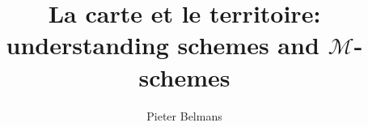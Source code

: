 \documentclass[11pt, a4paper, openany, oneside, article]{memoir}
\begin{document}
\title{La carte et le territoire: understanding schemes and $\mathcal{M}$-schemes}
\author{Pieter Belmans}
\maketitle

\tableofcontents*

\clearpage

\clearpage

\clearpage

\clearpage

\clearpage

\clearpage

\clearpage



\end{document}
